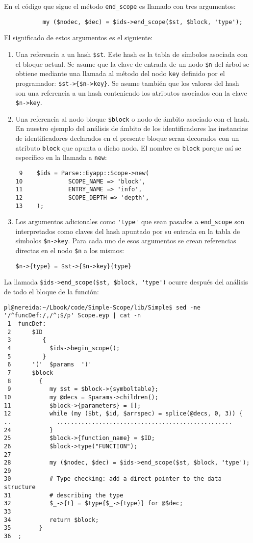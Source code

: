 En el código que sigue
el método \verb|end_scope| es llamado con tres argumentos:
\begin{verbatim}
           my ($nodec, $dec) = $ids->end_scope($st, $block, 'type');
\end{verbatim}
El significado de estos argumentos es el siguiente:
\begin{enumerate}
\item
Una referencia a un hash \verb|$st|.
Este hash es la tabla de símbolos asociada con el bloque actual.
Se asume que la clave de entrada de un nodo \verb|$n| del árbol
se obtiene mediante una llamada al método del nodo \verb|key| definido 
por el programador: \verb|$st->{$n->key}|. Se asume también que los 
valores del hash son una referencia a un hash conteniendo los atributos
asociados con la clave \verb|$n->key|.
\item
Una referencia
al nodo bloque \verb|$block| o nodo de ámbito asociado con el hash. 
En nuestro ejemplo del análisis de ámbito de los identificadores
las instancias de identificadores declarados en el presente bloque
seran decorados con un atributo \verb|block| que apunta a dicho nodo.
El nombre es  \verb|block| porque así se específico en la llamada a \verb|new|:
\begin{verbatim}
 9    $ids = Parse::Eyapp::Scope->new(
10             SCOPE_NAME => 'block',
11             ENTRY_NAME => 'info',
12             SCOPE_DEPTH => 'depth',
13    );
\end{verbatim}

\item
Los argumentos adicionales como \verb|'type'|
que sean pasados a \verb|end_scope| son interpretados como claves del hash 
apuntado por su entrada en la tabla de símbolos \verb|$n->key|.
Para cada uno de esos argumentos se crean referencias directas en el nodo \verb|$n| a los mismos:
\begin{verbatim}
$n->{type} = $st->{$n->key}{type}
\end{verbatim}
\end{enumerate}
La llamada \verb|$ids->end_scope($st, $block, 'type')| ocurre después del
análisis de todo el bloque de la función:
\begin{verbatim}
pl@nereida:~/Lbook/code/Simple-Scope/lib/Simple$ sed -ne '/^funcDef:/,/^;$/p' Scope.eyp | cat -n
 1  funcDef:
 2      $ID
 3         {
 4           $ids->begin_scope();
 5         }
 6      '('  $params  ')'
 7      $block
 8        {
 9           my $st = $block->{symboltable};
10           my @decs = $params->children();
11           $block->{parameters} = [];
12           while (my ($bt, $id, $arrspec) = splice(@decs, 0, 3)) {
..             ..................................................
24           }
25           $block->{function_name} = $ID;
26           $block->type("FUNCTION");
27
28           my ($nodec, $dec) = $ids->end_scope($st, $block, 'type');
29
30           # Type checking: add a direct pointer to the data-structure
31           # describing the type
32           $_->{t} = $type{$_->{type}} for @$dec;
33
34           return $block;
35        }
36  ;
\end{verbatim}
